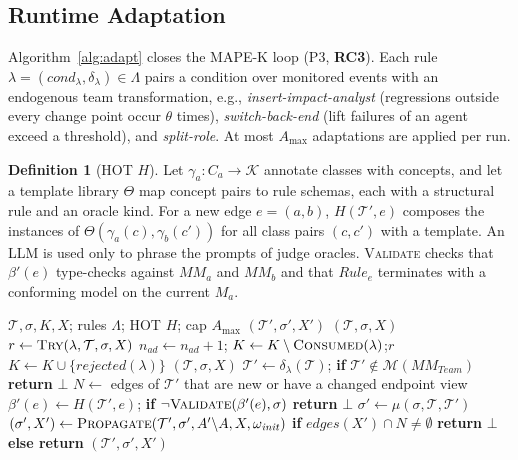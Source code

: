\documentclass[10pt, anonymous, conference]{IEEEtran}
\theoremstyle{definition}
\newtheorem{definition}{Definition}[section]
\theoremstyle{plain}
\theoremstyle{remark}
\newcommand{\MM}{\mathit{MM}}
\newcommand{\Mods}[1]{\mathcal{M}(#1)}
\newcommand{\Team}{\mathit{Team}}
\newcommand{\team}{\mathcal{T}}
\newcommand{\RC}[1]{\textbf{RC#1}}
\begin{document}
\subsection{Runtime Adaptation}\label{subsec:adapt}
Algorithm~\ref{alg:adapt} closes the MAPE-K loop (P3, \RC{3}). Each rule
$\lambda=(\mathit{cond}_\lambda,\delta_\lambda)\in\Lambda$ pairs a condition
over monitored events with an endogenous team transformation, e.g.,
\emph{insert-impact-analyst} (regressions outside every change point occur
$\theta$ times), \emph{switch-back-end} (lift failures of an agent exceed a
threshold), and \emph{split-role}. At most $A_{\max}$ adaptations are applied
per run.

\begin{definition}[HOT $H$]\label{def:H}
Let $\gamma_a\colon C_a\to\mathcal{K}$ annotate classes with concepts, and let
a template library $\Theta$ map concept pairs to rule schemas, each with a
structural rule and an oracle kind. For a new edge $e=(a,b)$,
$H(\team',e)$ composes the instances of $\Theta(\gamma_a(c),\gamma_b(c'))$ for
all class pairs $(c,c')$ with a template. An LLM is used only to phrase the
prompts of judge oracles. \textsc{Validate} checks that $\beta'(e)$ type-checks
against $\MM_a$ and $\MM_b$ and that $\mathit{Rule}_e$ terminates with a
conforming model on the current $M_a$.
\end{definition}

\begin{algorithm}[t]
\caption{\textsc{Adapt}: MAPE-K with HOT synthesis (L1--L2)}
\label{alg:adapt}
\small
\begin{algorithmic}[1]
\Input $\team,\sigma,K,X$; rules $\Lambda$; HOT $H$; cap $A_{\max}$
\Output $(\team',\sigma',X')$
 \Return $(\team,\sigma,X)$\EndIf
{}
  \If{$\mathit{cond}_\lambda(K,\team)$} 
    \State $r\gets\textsc{Try}(\lambda,\team,\sigma,X)$
     $n_{\mathit{ad}}\gets n_{\mathit{ad}}+1$;\;
       $K\gets K\setminus\textsc{Consumed}(\lambda)$;\;\Return $r$\EndIf
    \State $K\gets K\cup\{\mathit{rejected}(\lambda)\}$ 
  \EndIf
\EndFor
\State \Return $(\team,\sigma,X)$
\Statex
\Function{Try}{$\lambda,\team,\sigma,X$}
  \State $\team'\gets\delta_\lambda(\team)$;\;
         \textbf{if} $\team'\notin\Mods{\MM_{\Team}}$ \textbf{return} $\bot$
  \State $N\gets$ edges of $\team'$ that are new or have a changed endpoint view
   
    \State $\beta'(e)\gets H(\team',e)$;\;
           \textbf{if} $\neg\textsc{Validate}(\beta'(e),\sigma)$
           \textbf{return} $\bot$
  \EndFor
  \State $\sigma'\gets\mu(\sigma,\team,\team')$ 
  \State $(\sigma',X')\gets\textsc{Propagate}(\team',\sigma',A'{\setminus}A,X,
         \omega_{\mathit{init}})$
  \State \textbf{if} $\mathit{edges}(X')\cap N\neq\emptyset$ \textbf{return}
         $\bot$ \textbf{else return} $(\team',\sigma',X')$
\EndFunction
\end{algorithmic}
\end{algorithm}
\end{document}
